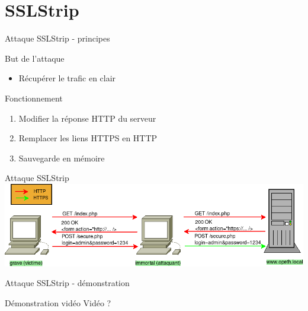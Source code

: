 \section{SSLStrip}



\begin{frame}[fragile]{Attaque SSLStrip - principes}
  \begin{block}{But de l'attaque}
    \begin{itemize}
    \item Récupérer le trafic en clair
    \end{itemize}
  \end{block}
  \begin{block}{Fonctionnement}
    \begin{enumerate}
      \item Modifier la réponse HTTP du serveur
      \item Remplacer les liens HTTPS en HTTP
      \item Sauvegarde en mémoire
    \end{enumerate}
  \end{block}
\end{frame}


\begin{frame}{Attaque SSLStrip}
    \includegraphics[width=\linewidth]{../medias/sslstrip/attack.png}
\end{frame}


\begin{frame}{Attaque SSLStrip - démonstration}
  \begin{block}{Démonstration vidéo}
    Vidéo ?
  \end{block}
\end{frame}

